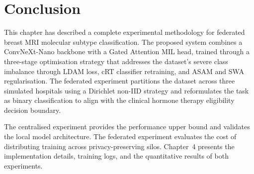 \section{Conclusion}
\label{sec:ch3-conclusion}

This chapter has described a complete experimental
methodology for federated breast MRI molecular subtype
classification.
The proposed system combines a ConvNeXt-Nano backbone with
a Gated Attention MIL head, trained through a three-stage
optimisation strategy that addresses the dataset's severe
class imbalance through LDAM loss, cRT classifier
retraining, and ASAM and SWA regularisation.
The federated experiment partitions the dataset across three
simulated hospitals using a Dirichlet non-IID strategy and
reformulates the task as binary classification to align with
the clinical hormone therapy eligibility decision boundary.

The centralised experiment provides the performance upper
bound and validates the local model architecture.
The federated experiment evaluates the cost of distributing
training across privacy-preserving silos.
Chapter~4 presents the implementation details, training
logs, and the quantitative results of both experiments.
